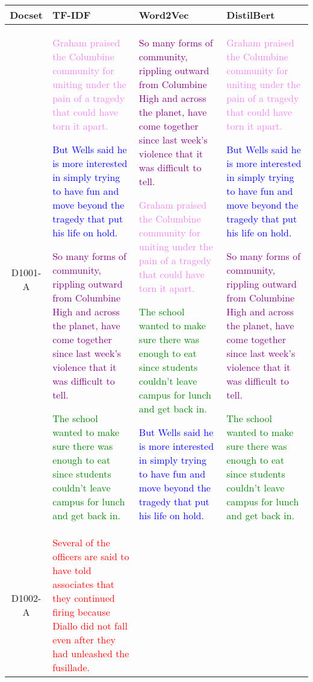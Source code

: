 \begin{table*}[t]
    \centering
    \begin{tabular}{|c|p{4.3cm}|p{4.3cm}|p{4.3cm}|}
        \hline
        Docset & TF-IDF & Word2Vec & DistilBert \\
        \hline
        D1001-A & 
        \textcolor{violet}{Graham praised the Columbine community for uniting under the pain of a tragedy that could have torn it apart.}
        
        \textcolor{blue}{But Wells said he is more interested in simply trying to have fun and move beyond the tragedy that put his life on hold.}
        
        \textcolor{purple}{So many forms of community, rippling outward from Columbine High and across the planet, have come together since last week's violence that it was difficult to tell.}
        
        \textcolor{green}{The school wanted to make sure there was enough to eat since students couldn't leave campus for lunch and get back in.}
        & 
        \textcolor{purple}{So many forms of community, rippling outward from Columbine High and across the planet, have come together since last week's violence that it was difficult to tell.}
        
        \textcolor{violet}{Graham praised the Columbine community for uniting under the pain of a tragedy that could have torn it apart.}
        
        \textcolor{green}{The school wanted to make sure there was enough to eat since students couldn't leave campus for lunch and get back in.}
        
        \textcolor{blue}{But Wells said he is more interested in simply trying to have fun and move beyond the tragedy that put his life on hold.}
        & 
        \textcolor{violet}{Graham praised the Columbine community for uniting under the pain of a tragedy that could have torn it apart.}
        
        \textcolor{blue}{But Wells said he is more interested in simply trying to have fun and move beyond the tragedy that put his life on hold.}
        
        \textcolor{purple}{So many forms of community, rippling outward from Columbine High and across the planet, have come together since last week's violence that it was difficult to tell.}
        
        \textcolor{green}{The school wanted to make sure there was enough to eat since students couldn't leave campus for lunch and get back in.}
        \\
        \hline
        D1002-A 
        & 
        \textcolor{red}{Several of the officers are said to have told associates that they continued firing because Diallo did not fall even after they had unleashed the fusillade.}
        

\end{tabular}
\end{table*}
